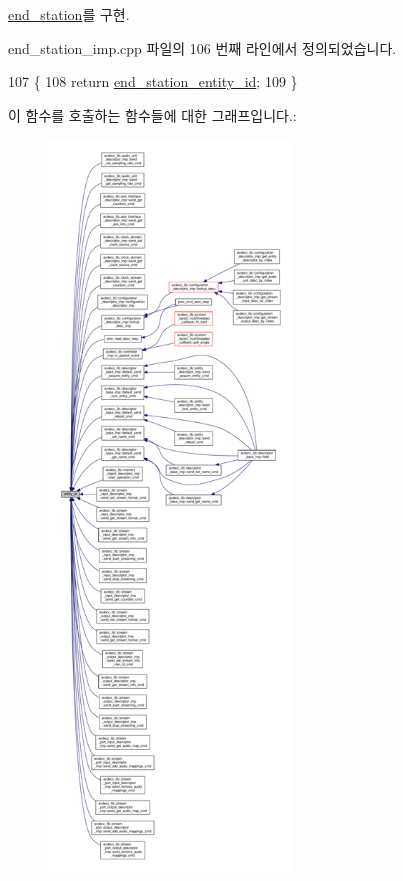 \hyperlink{classavdecc__lib_1_1end__station_a3374e7e9d63f8e1756480b16df9bc0c0}{end\+\_\+station}를 구현.



end\+\_\+station\+\_\+imp.\+cpp 파일의 106 번째 라인에서 정의되었습니다.


\begin{DoxyCode}
107 \{
108     \textcolor{keywordflow}{return} \hyperlink{classavdecc__lib_1_1end__station__imp_ac32ac278fb799e1b4f0cd539e0abe2b5}{end\_station\_entity\_id};
109 \}
\end{DoxyCode}


이 함수를 호출하는 함수들에 대한 그래프입니다.\+:
\nopagebreak
\begin{figure}[H]
\begin{center}
\leavevmode
\includegraphics[height=550pt]{classavdecc__lib_1_1end__station__imp_a363b6c9664a0d701def9b17863e20ad3_icgraph}
\end{center}
\end{figure}


